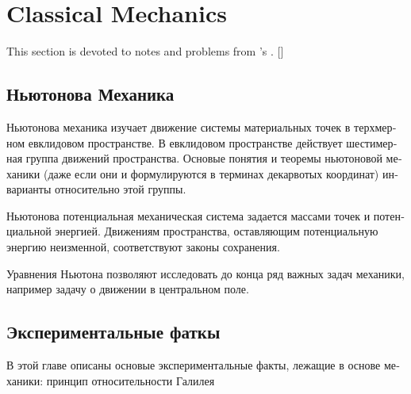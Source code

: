 \chapter{Classical Mechanics}
This section is devoted to notes and problems from 's \emph{}
\cite{arnold}. \textru{[]} []

\begin{otherlanguage}{russian}
\section{Ньютонова Механика}
Ньютонова механика изучает движение системы материальных точек в терхмерном
евклидовом пространстве. В евклидовом пространстве действует шестимерная
группа движений пространства. Основые понятия и теоремы ньютоновой механики
(даже если они и формулируются в терминах декарвотых координат) инварианты
относительно этой группы.

Ньютонова потенциальная механическая система задается массами точек и
потенциальной энергией. Движениям пространства, оставляющим потенциальную
энергию неизменной, соответствуют законы сохранения.

Уравнения Ньютона позволяют исследовать до конца ряд важных задач механики,
например задачу о движении в центральном поле.

\section{Экспериментальные фаткы}
В этой главе  описаны основые экспериментальные факты, лежащие в основе
механики: принцип относительности Галилея
\end{otherlanguage}

